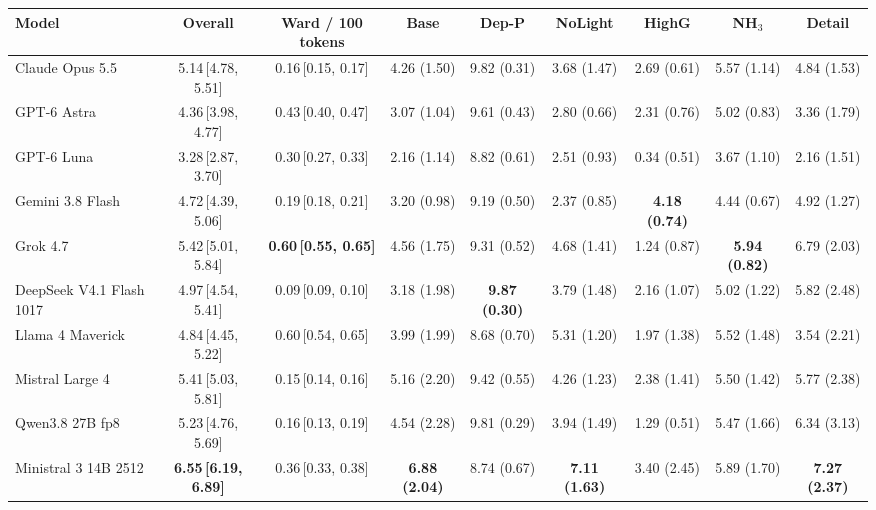 \begin{tabular}{lcccccccc}
  \toprule
  Model & Overall & Ward / 100 tokens & Base & Dep-P & NoLight & HighG & NH$_3$ & Detail \\
  \midrule
    Claude Opus 5.5 & 5.14\,[4.78, 5.51] & 0.16\,[0.15, 0.17] & 4.26 (1.50) & 9.82 (0.31) & 3.68 (1.47) & 2.69 (0.61) & 5.57 (1.14) & 4.84 (1.53) \\
    GPT-6 Astra & 4.36\,[3.98, 4.77] & 0.43\,[0.40, 0.47] & 3.07 (1.04) & 9.61 (0.43) & 2.80 (0.66) & 2.31 (0.76) & 5.02 (0.83) & 3.36 (1.79) \\
    GPT-6 Luna & 3.28\,[2.87, 3.70] & 0.30\,[0.27, 0.33] & 2.16 (1.14) & 8.82 (0.61) & 2.51 (0.93) & 0.34 (0.51) & 3.67 (1.10) & 2.16 (1.51) \\
    Gemini 3.8 Flash & 4.72\,[4.39, 5.06] & 0.19\,[0.18, 0.21] & 3.20 (0.98) & 9.19 (0.50) & 2.37 (0.85) & \textbf{4.18 (0.74)} & 4.44 (0.67) & 4.92 (1.27) \\
    Grok 4.7 & 5.42\,[5.01, 5.84] & \textbf{0.60\,[0.55, 0.65]} & 4.56 (1.75) & 9.31 (0.52) & 4.68 (1.41) & 1.24 (0.87) & \textbf{5.94 (0.82)} & 6.79 (2.03) \\
  \midrule
    DeepSeek V4.1 Flash 1017 & 4.97\,[4.54, 5.41] & 0.09\,[0.09, 0.10] & 3.18 (1.98) & \textbf{9.87 (0.30)} & 3.79 (1.48) & 2.16 (1.07) & 5.02 (1.22) & 5.82 (2.48) \\
    Llama 4 Maverick & 4.84\,[4.45, 5.22] & 0.60\,[0.54, 0.65] & 3.99 (1.99) & 8.68 (0.70) & 5.31 (1.20) & 1.97 (1.38) & 5.52 (1.48) & 3.54 (2.21) \\
    Mistral Large 4 & 5.41\,[5.03, 5.81] & 0.15\,[0.14, 0.16] & 5.16 (2.20) & 9.42 (0.55) & 4.26 (1.23) & 2.38 (1.41) & 5.50 (1.42) & 5.77 (2.38) \\
    Qwen3.8 27B fp8 & 5.23\,[4.76, 5.69] & 0.16\,[0.13, 0.19] & 4.54 (2.28) & 9.81 (0.29) & 3.94 (1.49) & 1.29 (0.51) & 5.47 (1.66) & 6.34 (3.13) \\
    Ministral 3 14B 2512 & \textbf{6.55\,[6.19, 6.89]} & 0.36\,[0.33, 0.38] & \textbf{6.88 (2.04)} & 8.74 (0.67) & \textbf{7.11 (1.63)} & 3.40 (2.45) & 5.89 (1.70) & \textbf{7.27 (2.37)} \\
  \bottomrule
\end{tabular}
